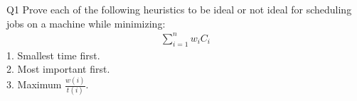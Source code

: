 \begin{problem}
  {Q1}
  Prove each of the following heuristics to be ideal or not ideal for scheduling jobs on a machine while minimizing:
  \begin{align*}
      \sum_{i = 1}^{n} w_iC_i
  \end{align*}
  1. Smallest time first. \\
  2. Most important first. \\
  3. Maximum $\frac{w(i)}{t(i)}$. \\
\end{problem}
